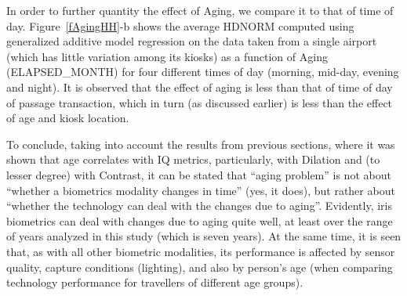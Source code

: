 \documentclass{cta-author}%
\newcommand{\cmt}[1]{}
\begin{document}
In order to further quantity the \cmt {negligible} effect of Aging, we compare it to that of 
time of day. Figure~\ref{fAgingHH}-b shows the average HDNORM computed using generalized additive model regression on the data taken from a single airport (which has little variation among its kiosks) as a function of Aging (ELAPSED\_MONTH) for four different times of day (morning, mid-day, evening and night).
It is observed that the effect of aging is less  than that of time of day of passage transaction, which in turn (as discussed earlier) is less than the effect of age and kiosk location.

To conclude, 
taking into account the results from previous sections, where it was shown that age correlates with IQ metrics, particularly, with Dilation  and (to lesser degree) with Contrast, it can be stated 
that ``aging problem'' is not about ``whether a biometrics modality changes in time'' (yes, it does), but rather about ``whether the technology can deal with the changes due to aging''. 
Evidently, iris biometrics can deal with changes due to aging quite well, at least 
over the range of years analyzed in this  study (which is seven years). 
At the same time, 
it is seen that, as with all other biometric modalities, its performance is affected by sensor quality, capture conditions (lighting), and also by person's age (when comparing technology performance for  travellers of  different age groups).

\end{document}

